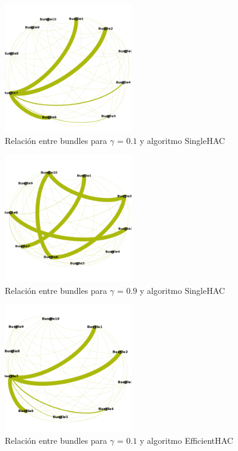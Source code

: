 \begin{figure}[H]
  \centering
    \includegraphics[width=0.5\textwidth]{resultados/papers/intra_inter/hac01.png}
  \caption{Relación entre bundles para $\gamma$ = $0.1$ y algoritmo SingleHAC}
  \label{res:img-papers-gamma01-hac}
\end{figure}

\begin{figure}[H]
  \centering
    \includegraphics[width=0.5\textwidth]{resultados/papers/intra_inter/hac09.png}
  \caption{Relación entre bundles para $\gamma$ = $0.9$ y algoritmo SingleHAC}
  \label{res:img-papers-gamma09-hac}
\end{figure}

\begin{figure}[H]
  \centering
    \includegraphics[width=0.5\textwidth]{resultados/papers/intra_inter/effhac01.png}
  \caption{Relación entre bundles para $\gamma$ = $0.1$ y algoritmo EfficientHAC}
  \label{res:img-papers-gamma01-effhac}
\end{figure}

